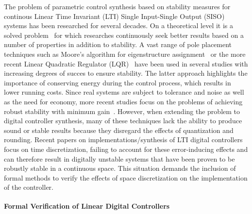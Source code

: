 \documentclass{sig-alternate-05-2015}
\begin{document}
The problem of parametric control synthesis based on stability measures for
continous Linear Time Invariant (LTI) Single Input-Single Output (SISO)
systems has been researched for several decades.  On a theoretical level it
is a solved problem~\cite{wonham1967pole} for which researches continuously
seek better results based on a number of properties in addition to
stability.  A vast range of pole placement techniques such as Moore's
algorithm for eigenstructure assignment~\cite{klein1977eigenvalue} or the
more recent Linear Quadratic Regulator (LQR)~\cite{bemporad2002explicit}
have been used in several studies with increasing degrees of succes to ensure
stability.  The latter approach highlights the importance of conserving
energy during the control process, which results in lower running costs.  
Since real systems are subject to tolerance and noise
as well as the need for economy, more recent studies focus on the problems of
achieving robust stability with minimum
gain~\cite{schmid2014unified,konigorski2012pole}.  However, when extending
the problem to digital controller synthesis, many of these techniques lack
the ability to produce sound or stable results because they disregard the
effects of quantization and rounding. Recent papers on
implementations/synthesis of LTI digital
controllers~\cite{das2013lqr,ghosh2013fpga} focus on time discretization,
failing to account for these error-inducing effects and can therefore result
in digitally unstable systems that have been proven to be robustly stable in
a continuous space.  This situation demands the inclusion of formal methods
to verify the effects of space discretization on the implementation of the
controller.

\paragraph{Formal Verification of Linear Digital Controllers} 
\end{document}
